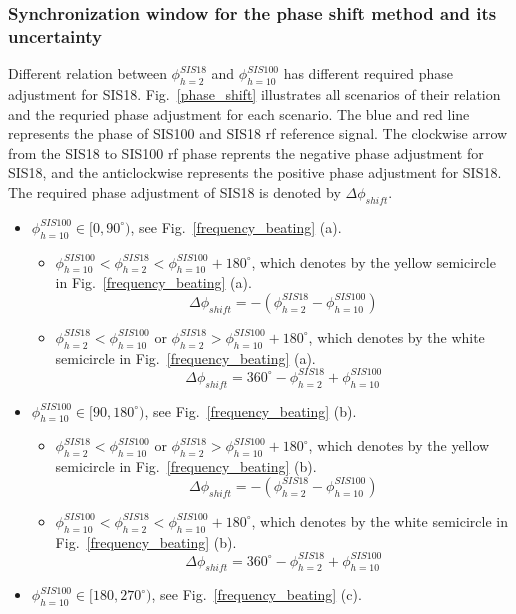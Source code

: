 \subsubsection{Synchronization window for the phase shift method and its uncertainty}
Different relation between $\phi_{h=2}^{SIS18}$ and $\phi_{h=10}^{SIS100}$ has different required phase adjustment for SIS18. Fig.~\ref{phase_shift} illustrates all scenarios of their relation and the requried phase adjustment for each scenario. The blue and red line represents the phase of SIS100 and SIS18 rf reference signal. The clockwise arrow from the SIS18 to SIS100 rf phase reprents the negative phase adjustment for SIS18, and the anticlockwise represents the positive phase adjustment for SIS18. The required phase adjustment of SIS18 is denoted by $\Delta \phi_{shift}$.
\begin{itemize}
    \item $\phi_{h=10}^{SIS100}\in [0,90^\circ)$, see Fig.~\ref{frequency_beating} (a).

	\begin{itemize}
		\item $\phi_{h=10}^{SIS100}< \phi_{h=2}^{SIS18}< \phi_{h=10}^{SIS100} +180^\circ$, which denotes by the yellow semicircle in Fig.~\ref{frequency_beating} (a).
    \begin{equation}
			\Delta \phi_{shift}=-(\phi_{h=2}^{SIS18} - \phi_{h=10}^{SIS100})
    \end{equation}
    		\item $\phi_{h=2}^{SIS18} < \phi_{h=10}^{SIS100}$ or  $\phi_{h=2}^{SIS18} >\phi_{h=10}^{SIS100} +180^\circ$, which denotes by the white semicircle in Fig.~\ref{frequency_beating} (a).
    \begin{equation}
			\Delta \phi_{shift}= 360^\circ - \phi_{h=2}^{SIS18} + \phi_{h=10}^{SIS100}
    \end{equation}
	\end{itemize}
    \item  $\phi_{h=10}^{SIS100}\in [90,180^\circ)$, see Fig.~\ref{frequency_beating} (b). 

	\begin{itemize}
		\item $\phi_{h=2}^{SIS18} < \phi_{h=10}^{SIS100}$ or  $\phi_{h=2}^{SIS18} >\phi_{h=10}^{SIS100} +180^\circ$, which denotes by the yellow semicircle in Fig.~\ref{frequency_beating} (b). 
	    \begin{equation}		
\Delta \phi_{shift}=-(\phi_{h=2}^{SIS18} - \phi_{h=10}^{SIS100})
    \end{equation}
    		\item $\phi_{h=10}^{SIS100}< \phi_{h=2}^{SIS18}< \phi_{h=10}^{SIS100} +180^\circ$, which denotes by the white semicircle in Fig.~\ref{frequency_beating} (b).  
    \begin{equation}			
\Delta \phi_{shift}=360^\circ - \phi_{h=2}^{SIS18} + \phi_{h=10}^{SIS100}
    \end{equation}
	\end{itemize}
    \item $\phi_{h=10}^{SIS100}\in [180,270^\circ)$, see Fig.~\ref{frequency_beating} (c).


\end{itemize}
